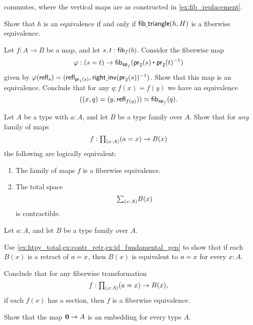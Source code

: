 \begin{exercises}
\begin{subexenum}
\begin{equation*}
\end{equation*}
commutes, where the vertical maps are as constructed in \cref{ex:fib_replacement}.
\item Show that $h$ is an equivalence if and only if $\mathsf{fib\underline{\ }{}triangle}(h,H)$ is a fiberwise equivalence.
\end{subexenum}
\item Let $f:A\to B$ be a map, and let $s,t : \mathsf{fib}_{f}(b)$. Consider the fiberwise map
\begin{equation*}
\varphi : (s=t)\to \fib{\apfunc{f}}{\ct{\proj 2(s)}{\proj 2(t)^{-1}}}
\end{equation*}
given by $\varphi(\mathsf{refl}_{s})=(\mathsf{refl}_{\mathsf{pr}_{1}(s)},\mathsf{right\underline{\ }{}inv}(\mathsf{pr}_{2}(s))^{-1})$. Show that this map is an equivalence. Conclude that for any $q:f(x)=f(y)$ we have an equivalence
\begin{equation*}
((x,q)=(y,\mathsf{refl}_{f(y)})) \simeq \mathsf{fib}_{\mathsf{ap}_{f}}(q).
\end{equation*}
\item \label{ex:id_fundamental_gen}Let $A$ be a type with $a:A$, and let $B$ be a type family over $A$. Show that for \emph{any} family of maps
\begin{equation*}
f:\prd{x:A} (a=x)\to B(x)
\end{equation*}
the following are logically equivalent:
\begin{enumerate}
\item The family of maps $f$ is a fiberwise equivalence.
\item The total space
\begin{equation*}
\sm{x:A}B(x)
\end{equation*}
is contractible.
\end{enumerate}
\item \label{ex:id_fundamental_retr}Let $a:A$, and let $B$ be a type family over $A$. 
\begin{subexenum}
\item Use \autoref{ex:htpy_total,ex:contr_retr,ex:id_fundamental_gen} to show that if each $B(x)$ is a retract of $\id{a}{x}$, then $B(x)$ is equivalent to $\id{a}{x}$ for every $x:A$.
\item Conclude that for any fiberwise transformation
\begin{equation*}
f : \prd{x:A} (a=x) \to B(x),
\end{equation*}
if each $f(x)$ has a section, then $f$ is a fiberwise equivalence.
\end{subexenum}
\item Show that the map $\mathbf{0}\to A$ is an embedding for every type $A$.

\end{exercises}
